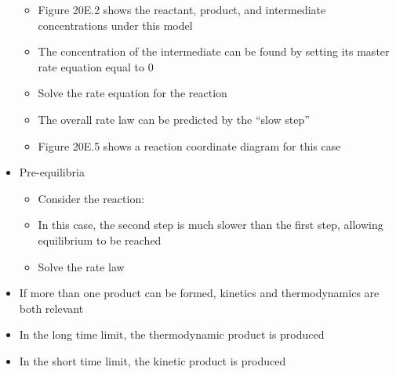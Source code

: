 \documentclass[12pt, openany, letterpaper]{memoir}
\begin{document}
\begin{itemize}
\begin{itemize}
		      \item Figure 20E.2 shows the reactant, product, and intermediate concentrations under this model
		      \item The concentration of the intermediate can be found by setting its master rate equation equal to 0
		      \item Solve the rate equation for the reaction 
		      \item The overall rate law can be predicted by the “slow step”
		      \item Figure 20E.5 shows a reaction coordinate diagram for this case
	      \end{itemize}
	\item Pre-equilibria
	      \begin{itemize}
		      \item Consider the reaction: 
		      \item In this case, the second step is much slower than the first step, allowing equilibrium to be reached
		      \item Solve the rate law
	      \end{itemize}
	\item If more than one product can be formed, kinetics and thermodynamics are both relevant
	\item In the long time limit, the thermodynamic product is produced
	\item In the short time limit, the kinetic product is produced
\end{itemize}
\end{document}
